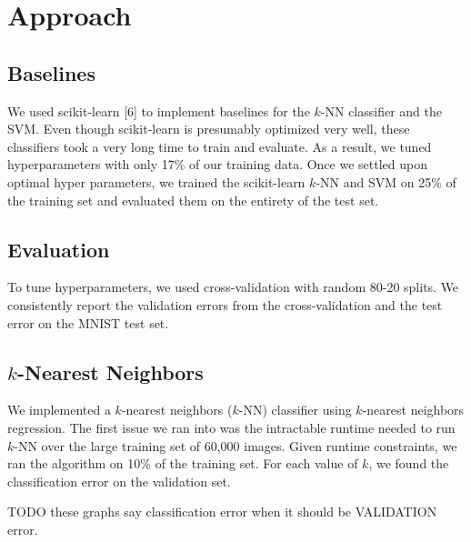 \documentclass{article} %
\begin{document}
\section{Approach}

\subsection{Baselines}
We used scikit-learn [6] to implement baselines for the $k$-NN classifier and the SVM.
Even though scikit-learn is presumably optimized very well, these classifiers took a very
long time to train and evaluate. As a result, we tuned hyperparameters with only
17\% of our training data. Once we settled upon optimal hyper
parameters, we trained the scikit-learn $k$-NN and SVM on 25\% of the training set and evaluated
them on the entirety of the test set.


\subsection{Evaluation}
To tune hyperparameters, we used cross-validation with random 80-20 splits. We
consistently report the validation errors from the cross-validation and the test
error on the MNIST test set.

\subsection{$k$-Nearest Neighbors}
We implemented a $k$-nearest neighbors ($k$-NN) classifier using
$k$-nearest neighbors regression. 
The first issue we ran into was the intractable runtime needed to run $k$-NN
over the large training set of 60,000 images. Given runtime constraints,
we ran the algorithm on 10\% of the training set.
For each value of $k$, we found the classification error on the validation set.

TODO these graphs say classification error when it should be VALIDATION error.
\end{document}
